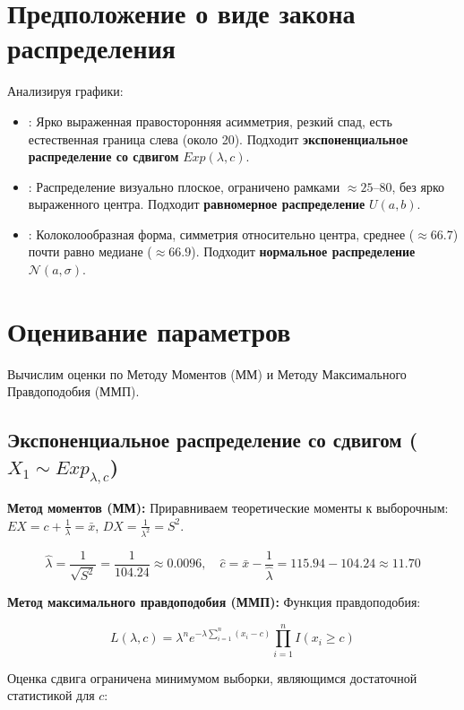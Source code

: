 \section{Предположение о виде закона распределения}

Анализируя графики:
\begin{itemize}
    \item[$X_1$]: Ярко выраженная правосторонняя асимметрия, резкий спад, есть естественная граница слева (около 20). Подходит \textbf{экспоненциальное распределение со сдвигом} $Exp(\lambda, c)$.
    
    \item[$X_2$]: Распределение визуально плоское, ограничено рамками $\approx 25$--$80$, без ярко выраженного центра. Подходит \textbf{равномерное распределение} $U(a,b)$.
    
    \item[$X_3$]: Колоколообразная форма, симметрия относительно центра, среднее ($\approx 66.7$) почти равно медиане ($\approx 66.9$). Подходит \textbf{нормальное распределение} $\mathcal{N}(a, \sigma)$.
\end{itemize}

\section{Оценивание параметров}

Вычислим оценки по Методу Моментов (ММ) и Методу Максимального Правдоподобия (ММП).

\subsection{Экспоненциальное распределение со сдвигом ($X_1 \sim Exp_{\lambda,c}$)}

\textbf{Метод моментов (ММ):} Приравниваем теоретические моменты к выборочным: $EX = c + \frac{1}{\lambda} = \bar{x}$, $DX = \frac{1}{\lambda^2} = S^2$.

$$
\hat{\lambda} = \frac{1}{\sqrt{S^2}} = \frac{1}{104.24} \approx 0.0096, \quad \hat{c} = \bar{x} - \frac{1}{\hat{\lambda}} = 115.94 - 104.24 \approx 11.70
$$

\textbf{Метод максимального правдоподобия (ММП):} Функция правдоподобия:

$$
L(\lambda, c) = \lambda^n e^{-\lambda \sum_{i=1}^{n}(x_i - c)} \prod_{i=1}^{n} I(x_i \ge c)
$$

Оценка сдвига ограничена минимумом выборки, являющимся достаточной статистикой для $c$:

